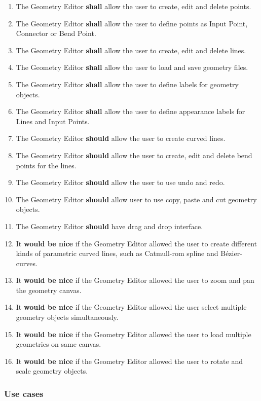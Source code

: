 \begin{enumerate}
	\item The Geometry Editor \textbf{shall} allow the user to create, edit and delete points.
	\item The Geometry Editor \textbf{shall} allow the user to define points as Input Point, Connector or Bend Point.
	\item The Geometry Editor \textbf{shall} allow the user to create, edit and delete lines.
	\item The Geometry Editor \textbf{shall} allow the user to load and save geometry files.
	\item The Geometry Editor \textbf{shall} allow the user to define labels for geometry objects.
	\item The Geometry Editor \textbf{shall} allow the user to define appearance labels for Lines and Input Points.
	\item The Geometry Editor \textbf{should} allow the user to create curved lines.
	\item The Geometry Editor \textbf{should} allow the user to create, edit and delete bend points for the lines.
	\item The Geometry Editor \textbf{should} allow the user to use undo and redo.
	\item The Geometry Editor \textbf{should} allow user to use copy, paste and cut geometry objects.
	\item The Geometry Editor \textbf{should} have drag and drop interface.
	\item It \textbf{would be nice} if the Geometry Editor allowed the user to create different kinds of parametric curved lines, such as Catmull-rom spline and Bézier-curves.
	\item It \textbf{would be nice} if the Geometry Editor allowed the user to zoom and pan the geometry canvas.
	\item It \textbf{would be nice} if the Geometry Editor allowed the user select multiple geometry objects simultaneously.
	\item It \textbf{would be nice} if the Geometry Editor allowed the user to load multiple geometries on same canvas.
	\item It \textbf{would be nice} if the Geometry Editor allowed the user to rotate and scale geometry objects.
\end{enumerate}

\subsubsection{Use cases}

